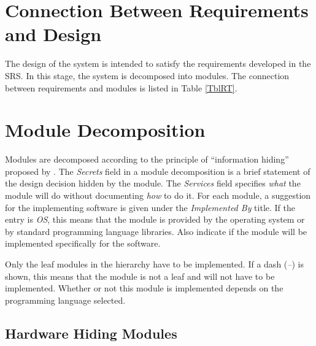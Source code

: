 \documentclass[12pt, titlepage]{article}
\begin{document}
\section{Connection Between Requirements and Design} \label{SecConnection}

The design of the system is intended to satisfy the requirements developed in
the SRS. In this stage, the system is decomposed into modules. The connection
between requirements and modules is listed in Table \ref{TblRT}.

\section{Module Decomposition} \label{SecMD}

Modules are decomposed according to the principle of ``information hiding''
proposed by \citet{ParnasEtAl1984}. The \emph{Secrets} field in a module
decomposition is a brief statement of the design decision hidden by the
module. The \emph{Services} field specifies \emph{what} the module will do
without documenting \emph{how} to do it. For each module, a suggestion for the
implementing software is given under the \emph{Implemented By} title. If the
entry is \emph{OS}, this means that the module is provided by the operating
system or by standard programming language libraries.  Also indicate if the
module will be implemented specifically for the software.

Only the leaf modules in the hierarchy have to be implemented. If a dash (\emph{--}) is shown, this means that the module is not a leaf and will not have to be implemented. Whether or not this module is implemented depends on the programming language
selected.

\subsection{Hardware Hiding Modules}

\end{document}
